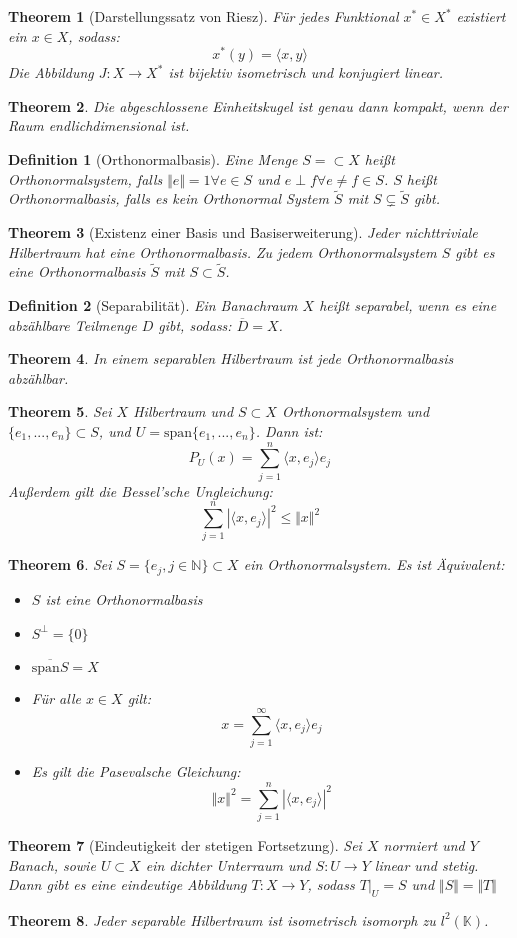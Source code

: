 \documentclass[10pt,a4paper]{article}
\newtheorem{theorem}{Theorem}
\newtheorem{definition}{Definition}
\begin{document}
\begin{theorem}[Darstellungssatz von Riesz]
	Für jedes Funktional $x^*\in X^*$ existiert ein $x\in X$, sodass:
	$$x^*(y) = \langle x, y\rangle$$ 
	Die Abbildung $J: X \to X^*$ ist bijektiv isometrisch und konjugiert linear.
\end{theorem}
\begin{theorem}
	Die abgeschlossene Einheitskugel ist genau dann kompakt, wenn der Raum endlichdimensional ist.
\end{theorem}
\begin{definition}[Orthonormalbasis]
	Eine Menge $S = \subset X$ heißt Orthonormalsystem, falls $\Vert e\Vert = 1 \forall e \in S$ und $e\perp f\forall e\neq f \in S$. $S$ heißt Orthonormalbasis, falls es kein Orthonormal System $\tilde{S}$ mit $S\subsetneq \tilde{S}$ gibt.
\end{definition}
\begin{theorem}[Existenz einer Basis und Basiserweiterung]
	Jeder nichttriviale Hilbertraum hat eine Orthonormalbasis. Zu jedem Orthonormalsystem $S$ gibt es eine Orthonormalbasis $\tilde{S}$ mit $S \subset \tilde{S}$.
\end{theorem}
\begin{definition}[Separabilität]
	Ein Banachraum $X$ heißt separabel, wenn es eine abzählbare Teilmenge $D$ gibt, sodass: $\overline{D} = X$.
\end{definition}
\begin{theorem}
	In einem separablen Hilbertraum ist jede Orthonormalbasis abzählbar.
\end{theorem}
\begin{theorem}
	Sei $X$ Hilbertraum und $S\subset X$ Orthonormalsystem und $\{e_1, ..., e_n\}\subset S$, und $U = \text{span}\{e_1, ..., e_n\}$. Dann ist:
	$$P_U(x)= \sum_{j=1}^n\langle x, e_j\rangle e_j$$
	Außerdem gilt die Bessel'sche Ungleichung:
	$$\sum_{j=1}^{n}|\langle x, e_j\rangle|^2 \leq \Vert x\Vert^2$$
\end{theorem}
\begin{theorem}
	Sei $S= \{e_j, j \in\mathbb{N} \}\subset X$ ein Orthonormalsystem. Es ist Äquivalent:
	\begin{itemize}
		\item $S$ ist eine Orthonormalbasis
		\item $S^\perp =\{0\}$
		\item $\overline{\text{span}S} = X$
		\item Für alle $x \in X$ gilt:
		$$x =\sum_{j=1}^{\infty}\langle x, e_j \rangle e_j$$
		\item Es gilt die Pasevalsche Gleichung:
		$$\Vert x\Vert^2 = \sum_{j=1}^{n}|\langle x, e_j\rangle|^2 $$
	\end{itemize}
\end{theorem}
\begin{theorem}[Eindeutigkeit der stetigen Fortsetzung]
	Sei $X$ normiert und $Y$ Banach, sowie $U\subset X$ ein dichter Unterraum und $S:  U\to Y$ linear und stetig. Dann gibt es eine eindeutige Abbildung $T: X \to Y$, sodass $T|_U = S$ und $\Vert S\Vert =\Vert T\Vert$
\end{theorem}
\begin{theorem}
	Jeder separable Hilbertraum ist isometrisch isomorph zu $l^2(\mathbb{K})$.
\end{theorem}
\end{document}
